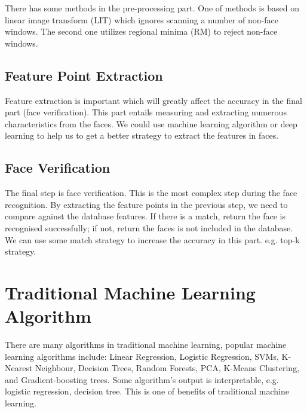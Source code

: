 \documentclass[10pt,twocolumn,letterpaper]{article}
\begin{document}
There has some methods in the pre-processing part.
One of methods is based on linear image transform (LIT) which ignores scanning a number of non-face windows. 
The second one utilizes regional minima (RM) to reject non-face windows. ~\cite{NAFCHI2012162}


\subsection{Feature Point Extraction}
Feature extraction is important which will greatly affect the accuracy in the final part (face verification).
This part entails measuring and extracting numerous characteristics from the faces.
We could use machine learning algorithm or deep learning to help us to get a better strategy to extract the features in faces.


\subsection{Face Verification}
The final step is face verification. This is the most complex step during the face recognition.
By extracting the feature points in the previous step, we need to compare against the database features.
If there is a match, return the face is recognised successfully; if not, return the faces is not included in the database.
We can use some match strategy to increase the accuracy in this part. e.g. top-k strategy.



\section{Traditional Machine Learning Algorithm}
\label{Traditional Machine Learning algorithm}

There are many algorithms in traditional machine learning, popular machine learning algorithms include: Linear Regression, Logistic Regression, SVMs, K-
Nearest Neighbour, Decision Trees, Random Forests, PCA, K-Means Clustering, and Gradient-boosting trees. 
Some algorithm's output is interpretable, e.g. logistic regression, decision tree. This is one of benefits of traditional machine learning.


\end{document}
